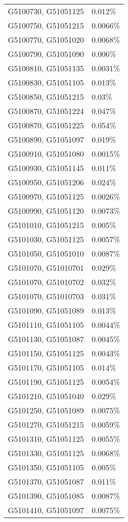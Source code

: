 \begin{longtable}[]{@{}ll@{}}
G5100730, G51051125 & 0.012\% \\
G5100750, G51051215 & 0.0066\% \\
G5100770, G51051020 & 0.0068\% \\
G5100790, G51051090 & 0.006\% \\
G5100810, G51051135 & 0.0031\% \\
G5100830, G51051105 & 0.013\% \\
G5100850, G51051215 & 0.03\% \\
G5100870, G51051224 & 0.047\% \\
G5100870, G51051225 & 0.054\% \\
G5100890, G51051097 & 0.019\% \\
G5100910, G51051080 & 0.0015\% \\
G5100930, G51051145 & 0.011\% \\
G5100950, G51051206 & 0.024\% \\
G5100970, G51051125 & 0.0026\% \\
G5100990, G51051120 & 0.0073\% \\
G5101010, G51051215 & 0.005\% \\
G5101030, G51051125 & 0.0057\% \\
G5101050, G51051010 & 0.0087\% \\
G5101070, G51010701 & 0.029\% \\
G5101070, G51010702 & 0.032\% \\
G5101070, G51010703 & 0.031\% \\
G5101090, G51051089 & 0.013\% \\
G5101110, G51051105 & 0.0044\% \\
G5101130, G51051087 & 0.0045\% \\
G5101150, G51051125 & 0.0043\% \\
G5101170, G51051105 & 0.014\% \\
G5101190, G51051125 & 0.0054\% \\
G5101210, G51051040 & 0.029\% \\
G5101250, G51051089 & 0.0075\% \\
G5101270, G51051215 & 0.0059\% \\
G5101310, G51051125 & 0.0055\% \\
G5101330, G51051125 & 0.0068\% \\
G5101350, G51051105 & 0.005\% \\
G5101370, G51051087 & 0.011\% \\
G5101390, G51051085 & 0.0087\% \\
G5101410, G51051097 & 0.0075\% \\

\end{longtable}
